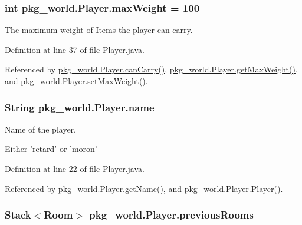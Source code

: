 \hypertarget{classpkg__world_1_1Player_a780685c88ad92ca6b280cf841ab33728}{
\subsubsection[{max\-Weight}]{\setlength{\rightskip}{0pt plus 5cm}int pkg\-\_\-world.\-Player.\-max\-Weight = 100\hspace{0.3cm}{\ttfamily [private]}}}\label{classpkg__world_1_1Player_a780685c88ad92ca6b280cf841ab33728}


The maximum weight of Items the player can carry. 



Definition at line \hyperlink{Player_8java_source_l00037}{37} of file \hyperlink{Player_8java_source}{Player.\-java}.



Referenced by \hyperlink{Player_8java_source_l00184}{pkg\-\_\-world.\-Player.\-can\-Carry()}, \hyperlink{Player_8java_source_l00079}{pkg\-\_\-world.\-Player.\-get\-Max\-Weight()}, and \hyperlink{Player_8java_source_l00087}{pkg\-\_\-world.\-Player.\-set\-Max\-Weight()}.

\hypertarget{classpkg__world_1_1Player_ab4c41ebebb7fcc55fa253e48af0c4267}{
\subsubsection[{name}]{\setlength{\rightskip}{0pt plus 5cm}String pkg\-\_\-world.\-Player.\-name\hspace{0.3cm}{\ttfamily [private]}}}\label{classpkg__world_1_1Player_ab4c41ebebb7fcc55fa253e48af0c4267}


Name of the player. 

Either 'retard' or 'moron' 

Definition at line \hyperlink{Player_8java_source_l00022}{22} of file \hyperlink{Player_8java_source}{Player.\-java}.



Referenced by \hyperlink{Player_8java_source_l00071}{pkg\-\_\-world.\-Player.\-get\-Name()}, and \hyperlink{Player_8java_source_l00059}{pkg\-\_\-world.\-Player.\-Player()}.

\hypertarget{classpkg__world_1_1Player_a28f9bc6a3c1d829996e8a38935b77fd1}{
\subsubsection[{previous\-Rooms}]{\setlength{\rightskip}{0pt plus 5cm}Stack$<${\bf Room}$>$ pkg\-\_\-world.\-Player.\-previous\-Rooms\hspace{0.3cm}{\ttfamily [private]}}}\label{classpkg__world_1_1Player_a28f9bc6a3c1d829996e8a38935b77fd1}


